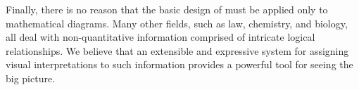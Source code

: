 Finally, there is no reason that the basic design of \Penrose{} must be applied only to mathematical diagrams. Many other fields, such as law, chemistry, and biology, all deal with non-quantitative information comprised of intricate logical relationships.  We believe that an extensible and expressive system for assigning visual interpretations to such information provides a powerful tool for seeing the big picture.


 







